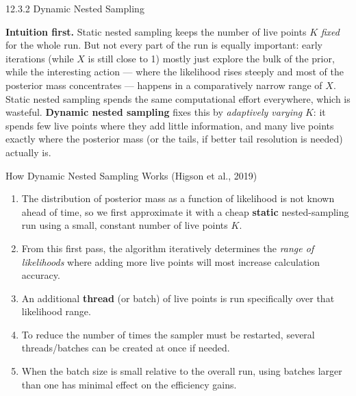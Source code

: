 \documentclass[aspectratio=169,10pt]{beamer}
\begin{document}
\begin{frame}[allowframebreaks]{12.3.2 Dynamic Nested Sampling}

\textbf{Intuition first.} Static nested sampling keeps the number of live points $K$ \emph{fixed} for the whole run. But not every part of the run is equally important: early iterations (while $X$ is still close to 1) mostly just explore the bulk of the prior, while the interesting action --- where the likelihood rises steeply and most of the posterior mass concentrates --- happens in a comparatively narrow range of $X$. Static nested sampling spends the same computational effort everywhere, which is wasteful. \textbf{Dynamic nested sampling} fixes this by \emph{adaptively varying} $K$: it spends few live points where they add little information, and many live points exactly where the posterior mass (or the tails, if better tail resolution is needed) actually is.

\begin{block}{How Dynamic Nested Sampling Works (Higson et al., 2019)}
\begin{enumerate}
  \item The distribution of posterior mass as a function of likelihood is not known ahead of time, so we first approximate it with a cheap \textbf{static} nested-sampling run using a small, constant number of live points $K$.
  \item From this first pass, the algorithm iteratively determines the \emph{range of likelihoods} where adding more live points will most increase calculation accuracy.
  \item An additional \textbf{thread} (or batch) of live points is run specifically over that likelihood range.
  \item To reduce the number of times the sampler must be restarted, several threads/batches can be created at once if needed.
  \item When the batch size is small relative to the overall run, using batches larger than one has minimal effect on the efficiency gains.
\end{enumerate}
\end{block}

\framebreak


\end{frame}
\end{document}
